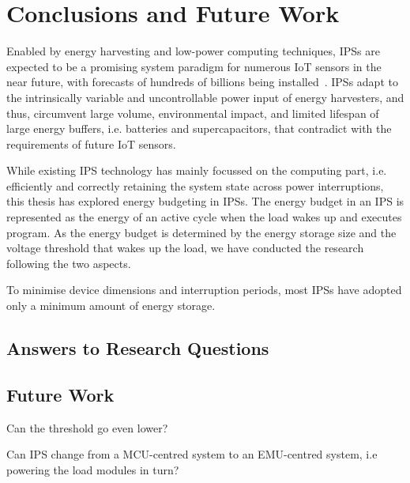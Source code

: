 \chapter{Conclusions and Future Work} \label{chapter:conclusion}

Enabled by energy harvesting and low-power computing techniques, IPSs are expected to be a promising system paradigm for numerous IoT sensors in the near future, with forecasts of hundreds of billions being installed~\cite{sparks2017trillion}.
IPSs adapt to the intrinsically variable and uncontrollable power input of energy harvesters, and thus, circumvent large volume, environmental impact, and limited lifespan of large energy buffers, i.e. batteries and supercapacitors, that contradict with the requirements of future IoT sensors.

While existing IPS technology has mainly focussed on the computing part, i.e. efficiently and correctly retaining the system state across power interruptions, this thesis has explored energy budgeting in IPSs. 
The energy budget in an IPS is represented as the energy of an active cycle when the load wakes up and executes program. 
As the energy budget is determined by the energy storage size and the voltage threshold that wakes up the load, we have conducted the research following the two aspects. 

To minimise device dimensions and interruption periods, most IPSs have adopted only a minimum amount of energy storage. 



\section{Answers to Research Questions}

\section{Future Work}

Can the threshold go even lower?

Can IPS change from a MCU-centred system to an EMU-centred system, i.e powering the load modules in turn?


